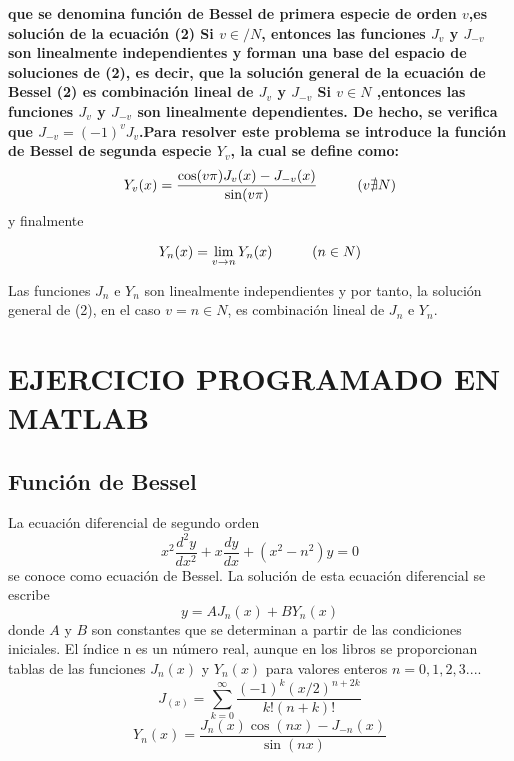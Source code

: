 \documentclass[12pt,a4paper]{article}
\begin{document}
\textbf{que se denomina función de Bessel de primera especie de orden $v$,es solución de la ecuación (2) Si $v \in/ N $, entonces las funciones $J_v$ y $J_{-v}$ son linealmente independientes y forman una base
del espacio de soluciones de (2), es decir, que la solución general de la ecuación de Bessel (2) es combinación lineal de $J_v$ y $J_{-v}$ Si $v\in N$ ,entonces las funciones $J_v$ y $J_{-v}$ son linealmente dependientes. De hecho, se verifica
que $J_{-v}=(-1)^{v}J_v$.Para resolver este problema se introduce la función de Bessel de segunda especie $Y_v$, la cual se define como:}
\begin{equation*}
Y_v(x)=\frac{\cos(v\pi)J_v(x)-J_{-v}(x)}{\sin(v\pi)}\hspace*{1cm}  (v\nexists N)
\end{equation*}
y finalmente

\vspace{0,1cm}
\begin{equation*}
Y_n(x)=\lim_{v \to n}Y_n(x) \hspace*{1cm} (n \in N)
\end{equation*}

\vspace{2cm}
Las funciones $J_n$ e $Y_n$ son linealmente independientes y por tanto, la solución general de (2), en el caso $v = n \in N$, es combinación lineal de $J_n$ e $Y_n$.

\section{EJERCICIO PROGRAMADO EN MATLAB}
\subsection{Función de Bessel}
La ecuación diferencial de segundo orden
\vspace{0,2cm}
\begin{equation*}
x^2\frac{d^2y}{dx^2}+x\frac{dy}{dx}+(x^2-n^2)y=0
\end{equation*}
\vspace{0,4cm}
se conoce como ecuación de Bessel. La solución de esta ecuación diferencial se escribe \vspace{0,2cm}
$$y=AJ_n(x)+BY_n(x)$$ \vspace{0,2cm} donde $A$ y $B$ son constantes que se determinan a partir de las condiciones iniciales. El índice n es un número real, aunque en los libros se proporcionan tablas de las funciones 
\vspace{0,2cm}
$J_n(x)$ y $Y_n(x)$ para valores enteros $n=0,1,2,3....$
\vspace{0,2cm}
\begin{equation*}
J_(x)=\sum _{k=0}^{\infty}\frac{(-1)^k(x/2)^{n+2k}}{k!(n+k)!}
\end{equation*}
\vspace{0,2cm}
\begin{equation*}
Y_n(x)=\frac{J_n(x)\cos(nx)-J_{-n}(x)}{\sin(nx)}
\end{equation*}
\end{document}
